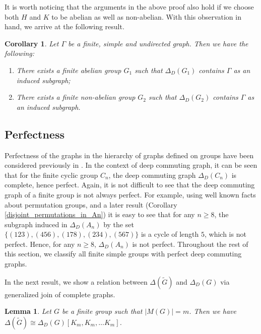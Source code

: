 \documentclass[12pt,a4paper]{article}
\newtheorem{lemma}[theorem]{Lemma}
\newtheorem{corollary}[theorem]{Corollary}
\begin{document}
It is worth noticing that the arguments in the above proof also hold if we choose both $H$ and $K$ to be abelian as well as non-abelian. With this observation in hand, we arrive at the following result.
\begin{corollary}\label{universality_corollary}
Let $\Gamma$ be a finite, simple and undirected graph. Then we have the following:
\begin{enumerate}[\rm (i)]
    \item There exists a finite abelian group $G_1$ such that $\Delta_D(G_1)$ contains $\Gamma$ as an induced subgraph;
    \item There exists a finite non-abelian group $G_2$ such that $\Delta_D(G_2)$ contains $\Gamma$ as an induced subgraph.
\end{enumerate}   
\end{corollary}

\subsection{Perfectness}\label{perfectness}
Perfectness of the graphs in the hierarchy of graphs defined on groups have been considered previously in \cite{britnell, cameron, cameron2}. In the context of deep commuting graph, it can be seen that for the finite cyclic group $C_n$, the deep commuting graph $\Delta_D(C_n)$ is complete, hence perfect. Again, it is not difficult to see that the deep commuting graph of a finite group is not always perfect. For example, using well known facts about permutation groups, and a later result (Corollary \ref{disjoint_permutations_in_An}) it is easy to see that for any $n\geq 8$, the subgraph induced in $\Delta_D(A_n)$ by the set $\{(123),(456),(178),(234),(567)\}$ is a cycle of length $5$, which is not perfect. Hence, for any $n\geq 8$, $\Delta_D(A_n)$ is not perfect. Throughout the rest of this section, we classify all finite simple groups with perfect deep commuting graphs.

In the next result, we show a relation between $\Delta(\tilde{G})$ and $\Delta_D(G)$ via generalized join of complete graphs.


\begin{lemma}\label{generalized join of the deep commuting graph}
Let $G$ be a finite group such that $\lvert M(G)\rvert=m$. Then we have $\Delta(\tilde{G})\cong\Delta_D(G)[K_m,K_m,\dots K_m]$.    
\end{lemma}
\end{document}
